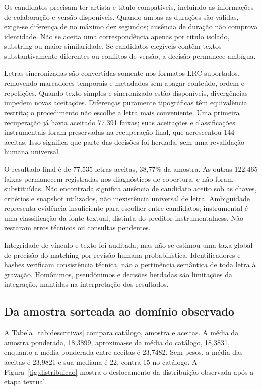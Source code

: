 Os candidatos precisam ter artista e título compatíveis, incluindo as informações de colaboração e versão disponíveis. Quando ambas as durações são válidas, exige-se diferença de no máximo dez segundos; ausência de duração não comprova identidade. Não se aceita uma correspondência apenas por título isolado, substring ou maior similaridade. Se candidatos elegíveis contêm textos substantivamente diferentes ou conflitos de versão, a decisão permanece ambígua.

Letras sincronizadas são convertidas somente nos formatos LRC suportados, removendo marcadores temporais e metadados sem apagar conteúdo, ordem e repetições. Quando texto simples e sincronizado estão disponíveis, divergências impedem novas aceitações. Diferenças puramente tipográficas têm equivalência restrita; o procedimento não escolhe a letra mais conveniente. Uma primeira recuperação já havia aceitado 77.391 faixas; suas aceitações e classificações instrumentais foram preservadas na recuperação final, que acrescentou 144 aceitas. Isso significa que parte das decisões foi herdada, sem uma revalidação humana universal.



O resultado final é de 77.535 letras aceitas, 38,77\% da amostra. As outras 122.465 faixas permanecem registradas nos diagnósticos de cobertura, e não foram substituídas. Não encontrada significa ausência de candidato aceito sob as chaves, critérios e snapshot utilizados, não inexistência universal de letra. Ambiguidade representa evidência insuficiente para escolher entre candidatos; instrumental é uma classificação da fonte textual, distinta do preditor instrumentalness. Não restaram erros técnicos ou consultas pendentes.

Integridade de vínculo e texto foi auditada, mas não se estimou uma taxa global de precisão do matching por revisão humana probabilística. Identificadores e hashes verificam consistência técnica, não a pertinência semântica de toda letra à gravação. Homônimos, pseudônimos e decisões herdadas são limitações da integração, mantidas na interpretação dos resultados.

\FloatBarrier
\subsection{Da amostra sorteada ao domínio observado}\label{subsec:selecao}
A Tabela~\ref{tab:descritivas} compara catálogo, amostra e aceitas. A média da amostra ponderada, 18,3899, aproxima-se da média do catálogo, 18,3831, enquanto a média ponderada entre aceitas é 23,7482. Sem pesos, a média das aceitas é 23,9821 e sua mediana é 22, contra 15 no catálogo. A Figura~\ref{fig:distribuicao} mostra o deslocamento da distribuição observada após a etapa textual.

